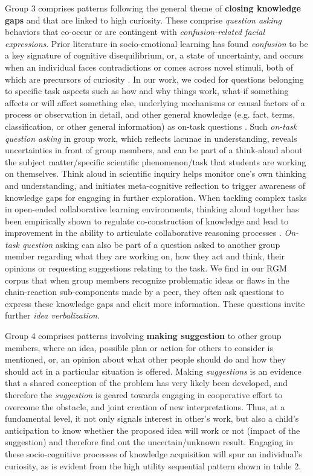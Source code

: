 \documentclass{llncs}
\begin{document}
Group 3 comprises patterns following the general theme of {\bf closing knowledge gaps} \cite{loewenstein1994psychology} and that are linked to high curiosity. These comprise {\em question asking} behaviors that co-occur or are contingent with {\em confusion-related facial expressions}. Prior literature in socio-emotional learning \cite{d2012dynamics} has found {\em confusion} to be a key signature of cognitive disequilibrium, or, a state of uncertainty, and occurs when an individual faces contradictions or comes across novel stimuli, both of which are precursors of curiosity \cite{berlyne1960conflict}. In our work, we coded for questions belonging to specific task aspects such as how and why things work, what-if something affects or will affect something else, underlying mechanisms or causal factors of a process or observation in detail, and other general knowledge (e.g. fact, terms, classification, or other general information) as on-task questions \cite{luce2015science}. Such {\em on-task question asking} in group work, which reflects lacunae in understanding, reveals uncertainties in front of group members, and can be part of a think-aloud about the subject matter/specific scientific phenomenon/task that students are working on themselves. Think aloud in scientific inquiry helps monitor one's own thinking and understanding, and initiates meta-cognitive reflection to trigger awareness of knowledge gaps for engaging in further exploration. When tackling complex tasks in open-ended collaborative learning environments, thinking aloud together has been empirically shown to regulate co-construction of knowledge and lead to improvement in the ability to articulate collaborative reasoning processes \cite{hogan1999thinking,mockel2013thinking}. {\em On-task question} asking can also be part of a question asked to another group member regarding what they are working on, how they act and think, their opinions or requesting suggestions relating to the task. We find in our RGM corpus that when group members recognize problematic ideas or flaws in the chain-reaction sub-components made by a peer, they often ask questions to express these knowledge gaps and elicit more information. These questions invite further {\em idea verbalization}. 

Group 4 comprises patterns involving {\bf making suggestion} to other group members, where an idea, possible plan or action for others to consider is mentioned, or, an opinion about what other people should do and how they should act in a particular situation is offered. Making {\em suggestions} is an evidence that a shared conception of the problem has very likely been developed, and therefore the {\em suggestion} is geared towards engaging in cooperative effort to overcome the obstacle, and joint creation of new interpretations. Thus, at a fundamental level, it not only signals interest in other's work, but also a child’s anticipation to know whether the proposed idea will work or not (impact of the suggestion) and therefore find out the uncertain/unknown result. Engaging in these socio-cognitive processes of knowledge acquisition will spur an individual's curiosity, as is evident from the high utility sequential pattern shown in table 2.
\end{document}
